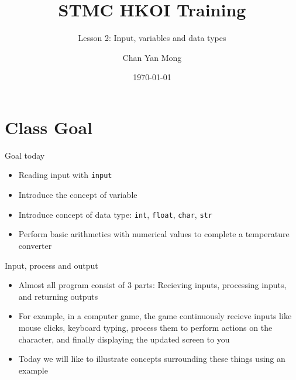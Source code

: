 \documentclass[10pt,xcolor={table,dvipsnames},t]{beamer}
\title[Your Short Title]{STMC HKOI Training}
\subtitle{Lesson 2: Input, variables and data types}
\author{Chan Yan Mong}
\date{\today}
\begin{document}
\begin{frame}
  \titlepage
\end{frame}


\section{Class Goal}

\begin{frame}{Goal today}

\begin{itemize}
  \item Reading input with \texttt{input}
  \item Introduce the concept of variable 
  \item Introduce concept of data type: \texttt{int}, \texttt{float}, \texttt{char}, \texttt{str}
  \item Perform basic arithmetics with numerical values to complete a temperature converter
\end{itemize}

\end{frame}

\begin{frame}{Input, process and output}
  \begin{itemize}
    \item Almost all program consist of 3 parts: Recieving inputs, processing inputs, and returning outputs
    \item For example, in a computer game, the game continuously recieve inputs like mouse clicks, keyboard typing, process them to perform actions on the character, and finally displaying the updated screen to you
    \item Today we will like to illustrate concepts surrounding these things using an example
  \end{itemize}
\end{frame}
\end{document}
